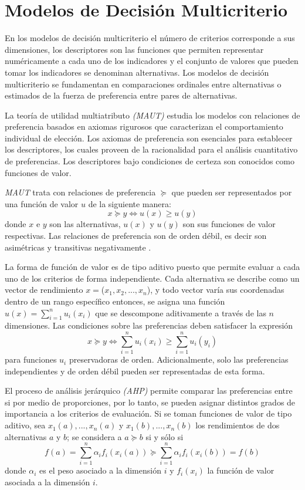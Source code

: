 \section{Modelos de Decisión Multicriterio }


En los modelos de decisión multicriterio el número de criterios corresponde a sus dimensiones, los descriptores son las funciones que permiten representar numéricamente a cada uno de los indicadores y el conjunto de valores que pueden tomar los indicadores se denominan alternativas. Los modelos de decisión multicriterio se fundamentan en comparaciones ordinales entre alternativas o estimados de la fuerza de preferencia entre pares de alternativas\citep{3}.

La teoría de utilidad multiatributo \textit{(MAUT)} estudia los modelos con relaciones de preferencia basados en axiomas rigurosos que caracterizan el comportamiento individual de elección. Los axiomas de preferencia son esenciales para establecer los descriptores, los cuales proveen de la racionalidad para el análisis cuantitativo de preferencias. Los descriptores bajo condiciones de certeza son conocidos como funciones de valor.

\textit{MAUT} trata con relaciones de preferencia $\succeq$ que pueden ser representados por una función de valor $u$ de la siguiente manera:
\[x\succeq y \Leftrightarrow u(x)\geq u(y)\]
donde $x$ e $y$ son las alternativas, $u(x)$ y $u(y)$ son sus funciones de valor respectivas. Las relaciones de preferencia son de orden débil, es decir son asimétricas y transitivas negativamente \citep{3}.

La forma de función de valor es de tipo aditivo puesto que permite evaluar a cada uno de los criterios de forma independiente. Cada alternativa se describe como un vector de rendimiento $x=$($x_{1}, x_{2},..., x_{n}$), y todo vector varía sus coordenadas dentro de un rango específico entonces, se asigna una función $u(x)=\sum\limits_{i=1}^{n}u_i(x_i)$ que se descompone aditivamente a través de las $n$ dimensiones. Las condiciones sobre las preferencias deben satisfacer la expresión
\[x\succeq y \Leftrightarrow \sum\limits_{i=1}^{n}u_i(x_i)\geq \sum\limits_{i=1}^{n}u_i(y_i)\]
para funciones $u_i$ preservadoras de orden\citep{3}. Adicionalmente, solo las preferencias independientes y de orden débil pueden ser representadas de esta forma\citep{2}.

El proceso de análisis jerárquico \textit{(AHP)} permite comparar las preferencias entre si por medio de proporciones, por lo tanto, se pueden asignar distintos grados de importancia a los criterios de evaluación. Si se toman funciones de valor de tipo aditivo, sea $x_{1}(a),..., x_{n}(a)$ y $x_{1}(b),..., x_{n}(b)$ los rendimientos de dos alternativas $a$ y $b$; se considera a $a \succeq b$ si y sólo si
\[f(a)=\sum\limits_{i=1}^{n}\alpha_if_i(x_i(a))\succeq \sum\limits_{i=1}^{n}\alpha_if_i(x_i(b))=f(b)\]
donde $\alpha_i$ es el peso asociado a la dimensión $i$ y $f_i(x_i)$ la función de valor asociada a la dimensión $i$\citep{2}.   
   
